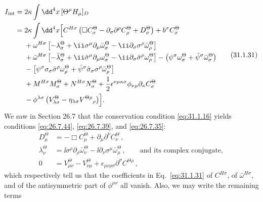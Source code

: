 \begin{equation}
  \begin{aligned}
  I_{\mathrm{int}}
  ={}&2\kappa\int \dd^4x\,[\Theta^\mu H_\mu]_D
  \\
  ={}&2\kappa\int \dd^4x\Bigl[
    C^{H\sigma}\left(
      \Box C_\sigma^\Theta
      -\partial_\sigma\partial^\rho C_\rho^\Theta
      +D_\sigma^\Theta
    \right)
    +b^\sigma C_\sigma^\Theta
  \\
  &+\omega^{H\sigma}\left[
      -\lambda_\sigma^\Theta
      +\ii\sigma^\mu\partial_\mu\bar\omega_\sigma^\Theta
      -\ii\partial_\sigma\sigma^\rho\bar\omega_\rho^\Theta
    \right]\\
  &+\bar\omega^{H\sigma}\left[
      -\bar\lambda_\sigma^\Theta
      +\ii\bar\sigma^\mu\partial_\mu\omega_\sigma^\Theta
      -\ii\partial_\sigma\bar\sigma^\rho\omega_\rho^\Theta
    \right]
    -\left(\psi^\sigma\omega_\sigma^\Theta
           +\bar\psi^\sigma\bar\omega_\sigma^\Theta\right)
  \\
  &-\left[
    \psi^\sigma\sigma_\sigma\bar\sigma^\rho\omega_\rho^\Theta
    +\bar\psi^\sigma\bar\sigma_\sigma\sigma^\rho
      \bar\omega_\rho^\Theta\right]
  \\
  &+M^{H\sigma}M_\sigma^\Theta
    +N^{H\sigma}N_\sigma^\Theta
    +\frac12\epsilon^{\nu\mu\kappa\sigma}
      \phi_{\nu\mu}\partial_\kappa C_\sigma^\Theta
  \\
  &-\phi^{\lambda\sigma}
    \left(
      V_{\lambda\sigma}^\Theta
      -\eta_{\lambda\sigma}V^{\Theta\rho}{}_\rho
    \right)
  \Bigr].
  \end{aligned}
  \tag{31.1.31}\label{eq:31.1.31}
\end{equation}
We saw in Section 26.7 that the conservation condition
\eqref{eq:31.1.16} yields conditions \eqref{eq:26.7.44},
\eqref{eq:26.7.39}, and \eqref{eq:26.7.35}:
\[
  \begin{aligned}
  D_\mu^\Theta
  &=-\Box C_\mu^\Theta+\partial_\mu\partial^\nu C_\nu^\Theta\,,
  \\
  \lambda_\nu^\Theta
  &=\ii\sigma^\rho\partial_\rho\bar\omega_\nu^\Theta
    -\ii\partial_\nu\sigma^\mu\bar\omega_\mu^\Theta\,,
  \qquad\text{and its complex conjugate},
  \\
  0
  &=V_{\mu\nu}^\Theta-V_{\nu\mu}^\Theta
    +\epsilon_{\mu\nu\rho\sigma}\partial^\sigma C^{\Theta\rho}\,,
  \end{aligned}
\]
which respectively tell us that the coefficients in Eq.~\eqref{eq:31.1.31}
of \(C^{H\sigma}\), of \(\bar\omega^{H\sigma}\), and of the antisymmetric
part of \(\phi^{\mu\nu}\) all vanish. Also, we may write the remaining terms
